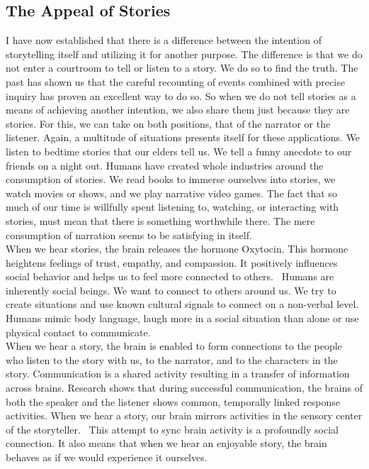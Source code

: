 \subsection{The Appeal of Stories}
I have now established that there is a difference between the intention of storytelling itself and utilizing it for another purpose. The difference is that we do not enter a courtroom to tell or listen to a story. We do so to find the truth. The past has shown us that the careful recounting of events combined with precise inquiry has proven an excellent way to do so. So when we do not tell stories as a means of achieving another intention, we also share them just because they are stories. For this, we can take on both positions, that of the narrator or the listener. Again, a multitude of situations presents itself for these applications. We listen to bedtime stories that our elders tell us. We tell a funny anecdote to our friends on a night out. Humans have created whole industries around the consumption of stories. We read books to immerse ourselves into stories, we watch movies or shows, and we play narrative video games. The fact that so much of our time is willfully spent listening to, watching, or interacting with stories, must mean that there is something worthwhile there. The mere consumption of narration seems to be satisfying in itself.\\
When we hear stories, the brain releases the hormone Oxytocin. This hormone heightens feelings of trust, empathy, and compassion. It positively influences social behavior and helps us to feel more connected to others.~\cite{Gottschall2012} Humans are inherently social beings. We want to connect to others around us. We try to create situations and use known cultural signals to connect on a non-verbal level. Humans mimic body language, laugh more in a social situation than alone or use physical contact to communicate.~\cite{Frith2007}\\
When we hear a story, the brain is enabled to form connections to the people who listen to the story with us, to the narrator, and to the characters in the story. Communication is a shared activity resulting in a transfer of information across brains. Research shows that during successful communication, the brains of both the speaker and the listener shows common, temporally linked response activities. When we hear a story, our brain mirrors activities in the sensory center of the storyteller.~\cite{Stephens2010} This attempt to sync brain activity is a profoundly social connection. It also means that when we hear an enjoyable story, the brain behaves as if we would experience it ourselves.
